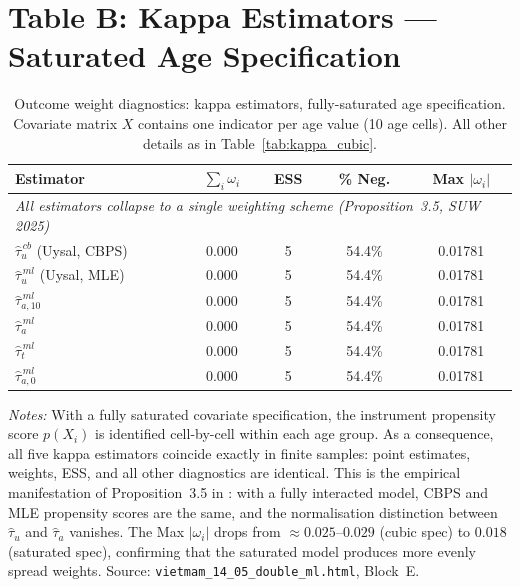 \documentclass[12pt, a4paper]{article}
\begin{document}
\section*{Table B: Kappa Estimators --- Saturated Age Specification}

\begin{table}[ht]
\centering
\caption{Outcome weight diagnostics: kappa estimators, fully-saturated
  age specification. Covariate matrix $X$ contains one indicator per age
  value (10 age cells). All other details as in Table~\ref{tab:kappa_cubic}.}
\label{tab:kappa_saturated}
\vspace{6pt}
\begin{tabular}{lcccc}
\toprule
\textbf{Estimator} & $\sum_i \omega_i$ & \textbf{ESS} &
  \textbf{\% Neg.} & \textbf{Max $|\omega_i|$} \\
\midrule
\multicolumn{5}{l}{\textit{All estimators collapse to a single weighting
  scheme (Proposition~3.5, SUW 2025)}} \\[3pt]
\rowcolor{normgreen}
$\hat{\tau}_u^{\,cb}$ \quad (Uysal, CBPS)   & $0.000$ & 5 & 54.4\% & 0.01781 \\
\rowcolor{normgreen}
$\hat{\tau}_u^{\,ml}$ \quad (Uysal, MLE)    & $0.000$ & 5 & 54.4\% & 0.01781 \\
\rowcolor{normgreen}
$\hat{\tau}_{a,10}^{\,ml}$ & $0.000$ & 5 & 54.4\% & 0.01781 \\
\rowcolor{normgreen}
$\hat{\tau}_a^{\,ml}$      & $0.000$ & 5 & 54.4\% & 0.01781 \\
\rowcolor{normgreen}
$\hat{\tau}_t^{\,ml}$      & $0.000$ & 5 & 54.4\% & 0.01781 \\
\rowcolor{normgreen}
$\hat{\tau}_{a,0}^{\,ml}$  & $0.000$ & 5 & 54.4\% & 0.01781 \\
\bottomrule
\end{tabular}
\smallskip

\noindent\footnotesize
\textit{Notes:}
With a fully saturated covariate specification, the instrument propensity
score $p(X_i)$ is identified cell-by-cell within each age group. As a
consequence, all five kappa estimators coincide exactly in finite samples:
point estimates, weights, ESS, and all other diagnostics are identical.
This is the empirical manifestation of Proposition~3.5 in \citet{sloczyn2025kappa}:
with a fully interacted model, CBPS and MLE propensity scores are the same,
and the normalisation distinction between $\hat{\tau}_u$ and $\hat{\tau}_a$
vanishes. The Max $|\omega_i|$ drops from $\approx 0.025$--$0.029$ (cubic
spec) to $0.018$ (saturated spec), confirming that the saturated model
produces more evenly spread weights. Source: \texttt{vietmam\_14\_05\_double\_ml.html},
Block~E.
\end{table}
\end{document}
